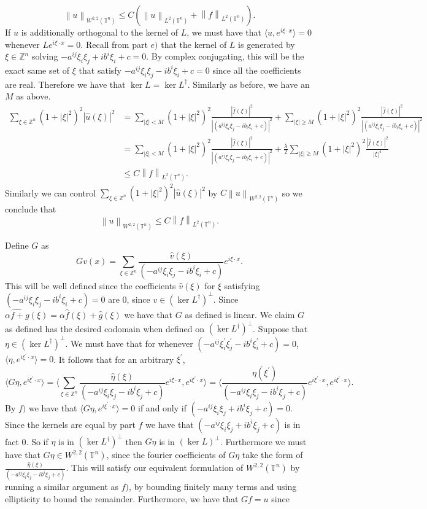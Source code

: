 \documentclass[12pt, a4paper]{article}
\theoremstyle{definition}
\newcommand{\Z}{\mathbb{Z}}                           %
\newcommand{\T}{\mathbb{T}}                         %
\newcommand{\lan}{\langle}
\newcommand{\ran}{\rangle}
\newcommand{\norm}[1]{\left\lVert#1\right\rVert}
\newcommand{\inn}[1]{\lan#1\ran}
\begin{document}
$$\norm{u}_{W^{2,2}(\T^n)} \leq C \left( \norm{u}_{L^2(\T^n)} + \norm{f}_{L^2(\T^n)}\right).$$
If $u$ is additionally orthogonal to the kernel of $L$, we must have that $\inn{u , e^{i \xi \cdot x}} = 0$ whenever $Le^{i \xi \cdot x} = 0$. Recall from part $e)$ that the kernel of $L$ is generated by $\xi \in \Z^n $ solving $-a^{ij} \xi_i \xi_j + i b^i \xi_i + c = 0$. By complex conjugating, this will be the exact same set of $\xi$ that satisfy $-a^{ij} \xi_i \xi_j - i b^i \xi_i + c = 0$ since all the coefficients are real. Therefore we have that $\ker L = \ker L^\dagger$. 
Similarly as before, we have an $M$ as above. 
\begin{align*}
\sum_{\xi \in \Z^n} (1+|\xi|^2)^2 |\hat{u}(\xi)|^2 
&= \sum_{|\xi | < M} (1+|\xi|^2)^2\frac{|\hat{f}(\xi)|^2}{|(a^{ij} \xi_i\xi_j - i b_i\xi_i + c )|^2} +\sum_{|\xi| \geq M} (1+|\xi|^2)^2 \frac{|\hat{f}(\xi)|^2}{|(a^{ij} \xi_i\xi_j - i b_i\xi_i + c )|^2}
\\ & = \sum_{|\xi | < M} (1+|\xi|^2)^2\frac{|\hat{f}(\xi)|^2}{|(a^{ij} \xi_i\xi_j - i b_i\xi_i + c )|^2} + \frac{\lambda}{2} \sum_{|\xi| \geq M} (1+|\xi|^2)^2\frac{|\hat{f}(\xi)|^2}{|\xi|^4}
\\ & \leq C\norm{f}_{L^2(\T^n)}. 
\end{align*}
Similarly we can control $\sum_{\xi \in \Z^n} (1+|\xi|^2)^2 |\hat{u}(\xi)|^2$ by $C \norm{u}_{W^{2,2}(\T^n)}$ so we conclude that 
$$\norm{u}_{W^{2,2}(\T^n)} \leq C \norm{f}_{L^2(\T^n)}. $$
\item Define $G$ as $$Gv(x) = \sum_{\xi \in \Z^n} \frac{\hat{v}(\xi)}{(-a^{ij} \xi_i \xi_j - i b^{i} \xi_i + c)} e^{i \xi \cdot x}.$$
This will be well defined since the coefficients $\hat{v}(\xi)$ for $\xi$ satisfying $(-a^{ij} \xi_i \xi_j - i b^{i} \xi_i + c) =0$ are 0, since $v\in (\ker L^\dagger)^\perp$. 
Since $\widehat{\alpha f + g}(\xi) = \alpha \hat{f} (\xi)+ \hat{g}(\xi)$ we have that $G$ as defined is linear. We claim $G$ as defined has the desired codomain when defined on $(\ker L^\dagger)^\perp$. Suppose that $\eta \in (\ker L^\dagger)^\perp$. We must have that for whenever $(-a^{ij} \xi^\prime_i \xi^\prime_j - ib^{i}\xi^\prime_i +c ) = 0$, $\inn{\eta, e^{i \xi^\prime \cdot x}} =0$. It follows that for an arbitrary $\xi^\prime$, 
$$\inn{G\eta, e^{i \xi^\prime \cdot x}} = \inn{\sum_{\xi \in \Z^n} \frac{\hat{\eta}(\xi)}{(-a^{ij}\xi_i \xi_j - i b^{i}\xi_j + c)}e^{i \xi \cdot x},e^{i \xi^\prime \cdot x}}= \inn{\frac{{\eta}(\xi^\prime)}{(-a^{ij}\xi_i \xi_j - i b^{i}\xi_j + c)} e^{i \xi^\prime \cdot x}, e^{i \xi^\prime \cdot x}}.$$
By $f)$ we have that $\inn{G\eta, e^{i \xi^\prime \cdot x} } = 0$ if and only if $(-a^{ij}\xi_i \xi_j + i b^{i}\xi_j + c) = 0$. Since the kernels are equal by part $f$ we have that $(-a^{ij}\xi_i \xi_j + i b^{i}\xi_j + c)$ is in fact 0. So if $\eta$ is in $(\ker L^\dagger)^\perp$ then $G\eta$ is in $(\ker L)^\perp$. Furthermore we must have that $G\eta \in W^{2,2}(\T^n)$, since the fourier coefficients of $G\eta$ take the form of $\frac{\hat{\eta}(\xi)}{(-a^{ij}\xi_i \xi_j - i b^{i}\xi_j + c)}$. This will satisfy our equivalent formulation of $W^{2,2}(\T^n)$ by running a similar argument as $f)$, by bounding finitely many terms and using ellipticity to bound the remainder. Furthermore, we have that $Gf = u$ since
\end{document}
